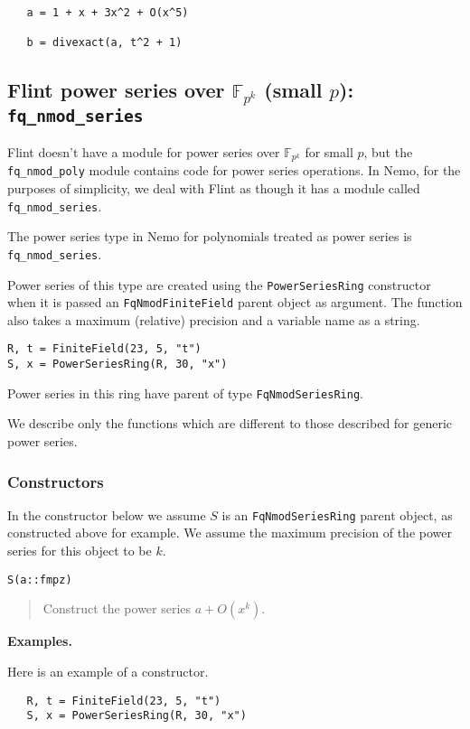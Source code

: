 \documentclass[a4paper,10pt]{article}
\newcommand{\F}{\mathbb{F}}
\newcommand{\code}{\lstinline}
\newcommand{\desc}[1]{\vspace{-3mm}\begin{quote}#1\end{quote}}
\begin{document}
{{\begin{lstlisting}
   a = 1 + x + 3x^2 + O(x^5)
   
   b = divexact(a, t^2 + 1)
\end{lstlisting}

\subsection{Flint power series over $\F_{p^k}$ (small $p$): \code{fq_nmod_series}}

Flint doesn't have a module for power series over $\F_{p^k}$ for small $p$, but the
\code{fq_nmod_poly} module contains code for power series operations. In Nemo, for the
purposes of simplicity, we deal with Flint as though it has a module called
\code{fq_nmod_series}.

The power series type in Nemo for polynomials treated as power series is
\code{fq_nmod_series}. 

Power series of this type are created using the \code{PowerSeriesRing} constructor when
it is passed an \code{FqNmodFiniteField} parent object as argument. The function also
takes a maximum (relative) precision and a variable name as a string.

\begin{lstlisting}
R, t = FiniteField(23, 5, "t")
S, x = PowerSeriesRing(R, 30, "x")
\end{lstlisting}

Power series in this ring have parent of type \code{FqNmodSeriesRing}.

We describe only the functions which are different to those described for generic
power series.

\subsubsection{Constructors}

In the constructor below we assume $S$ is an \code{FqNmodSeriesRing} parent object, as
constructed above for example. We assume the maximum precision of the power series
for this object to be $k$.

\begin{lstlisting}
S(a::fmpz)
\end{lstlisting}

\desc{Construct the power series $a + O(x^k)$.}

\textbf{Examples.}

Here is an example of a constructor.

\begin{lstlisting}
   R, t = FiniteField(23, 5, "t")
   S, x = PowerSeriesRing(R, 30, "x")


\end{lstlisting}}}
\end{document}
